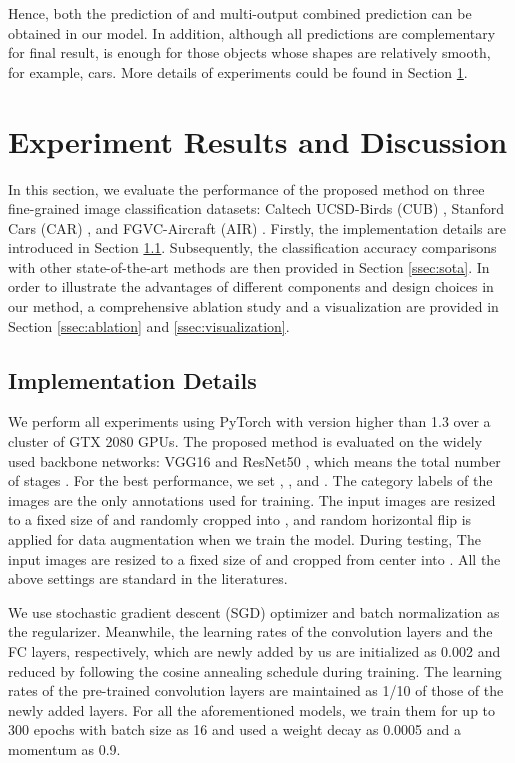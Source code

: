 \documentclass{llncs}
\begin{document}
Hence, both the prediction of  and multi-output combined prediction can be obtained in our model. In addition, although all predictions are complementary for final result,  is enough for those objects whose shapes are relatively smooth, for example, cars. More details of experiments could be found in Section \ref{sec:experiments}.


\section{Experiment Results and Discussion} \label{sec:experiments}

In this section, we evaluate the performance of the proposed method on three ﬁne-grained image classiﬁcation datasets: Caltech UCSD-Birds (CUB) \cite{wah2011caltech}, Stanford Cars (CAR) \cite{krause20133d}, and FGVC-Aircraft (AIR) \cite{maji2013fine}. Firstly, the implementation details are introduced in Section \ref{ssec:implementation}. Subsequently, the classiﬁcation accuracy comparisons with other state-of-the-art methods are then provided in Section \ref{ssec:sota}. In order to illustrate the advantages of different components and design choices in our method, a comprehensive ablation study and a visualization are provided in Section \ref{ssec:ablation} and \ref{ssec:visualization}.

\subsection{Implementation Details}\label{ssec:implementation}
 We perform all experiments using PyTorch \cite{paszke2017automatic} with version higher than 1.3 over a cluster of GTX 2080 GPUs. The proposed method is evaluated on the widely used backbone networks: VGG16 \cite{simonyan2014very} and ResNet50 \cite{he2016deep}, which means the total number of stages . For the best performance, we set , , and . The category labels of the images are the only annotations used for training. The input images are resized to a ﬁxed size of  and randomly cropped into , and random horizontal ﬂip is applied for data augmentation when we train the model. During testing, The input images are resized to a ﬁxed size of  and cropped from center into . All the above settings are standard in the literatures. 
 
 We use stochastic gradient descent (SGD) optimizer and batch normalization as the regularizer. Meanwhile, the learning rates of the convolution layers and the FC layers, respectively, which are newly added by us are initialized as 0.002 and reduced by following the cosine annealing schedule \cite{loshchilov2016sgdr} during training. The learning rates of the pre-trained convolution layers are maintained as 1/10 of those of the newly added layers. For all the aforementioned models, we train them for up to 300 epochs with batch size as 16 and used a weight decay as 0.0005 and a momentum as 0.9.
\end{document}
